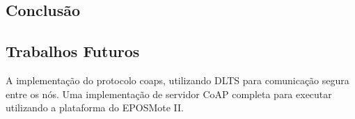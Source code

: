 

\subsection{Conclus\~ao}
\subsection{Trabalhos Futuros}

A implementa\c{c}\~ao do protocolo coaps, utilizando DLTS para comunica\c{c}\~ao segura entre os n\'os.
Uma implementa\c{c}\~ao de servidor CoAP completa para executar utilizando a plataforma do EPOSMote II.
